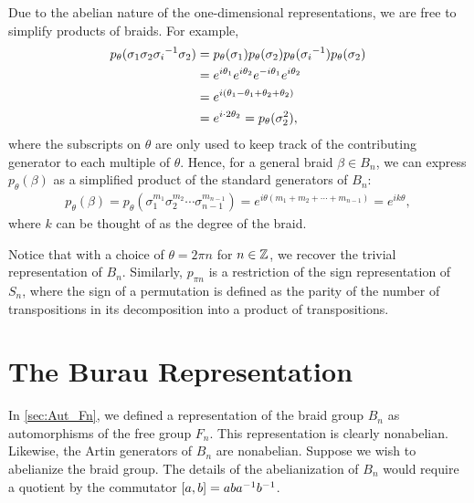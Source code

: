 Due to the abelian nature of the one-dimensional representations, we are free to simplify products of braids. For example,
\begin{align*}
    p_\theta(\sigma_1\sigma_{2}{ \sigma_i }^{-1}\sigma_2) &= p_\theta(\sigma_1)p_\theta(\sigma_{2})p_\theta({ \sigma_i }^{-1})p_\theta(\sigma_2) \\
    &= e^{i\theta_1}e^{i\theta_2}e^{-i\theta_{1}}e^{i\theta_2} \\
    &= e^{i\left( \theta_1-\theta_1 + \theta_2 + \theta_2 \right)} \\
    &= e^{i\cdot 2\theta_2} = p_\theta(\sigma_2^2),
\end{align*}
where the subscripts on $\theta$ are only used to keep track of the contributing generator to each multiple of $\theta$. Hence, for a general braid $\beta\in B_n$, we can express $p_\theta(\beta)$ as a simplified product of the standard generators of $B_n$:
\begin{align*}
    p_\theta(\beta) = p_\theta(\sigma_{1}^{m_1}\sigma_{2}^{m_2}\cdots\sigma_{n-1}^{m_{n-1}}) = e^{i\theta(m_1+m_2+\cdots+m_{n-1})} = e^{ik\theta},
\end{align*}
where $k$ can be thought of as the degree of the braid.

Notice that with a choice of $\theta=2\pi n$ for $n\in\mathbb{Z}$, we recover the trivial representation of $B_n$. Similarly, $p_{\pi n}$ is a restriction of the sign representation of $S_n$, where the sign of a permutation is defined as the parity of the number of transpositions in its decomposition into a product of transpositions.


\section{The Burau Representation}
In \cref{sec:Aut_Fn}, we defined a representation of the braid group $B_n$ as automorphisms of the free group $F_n$. This representation is clearly nonabelian. Likewise, the Artin generators of $B_n$ are nonabelian. Suppose we wish to abelianize the braid group. The details of the abelianization of $B_n$ would require a quotient by the commutator $\left[ a,b \right]=ab{ a }^{-1}{ b }^{-1}$.


